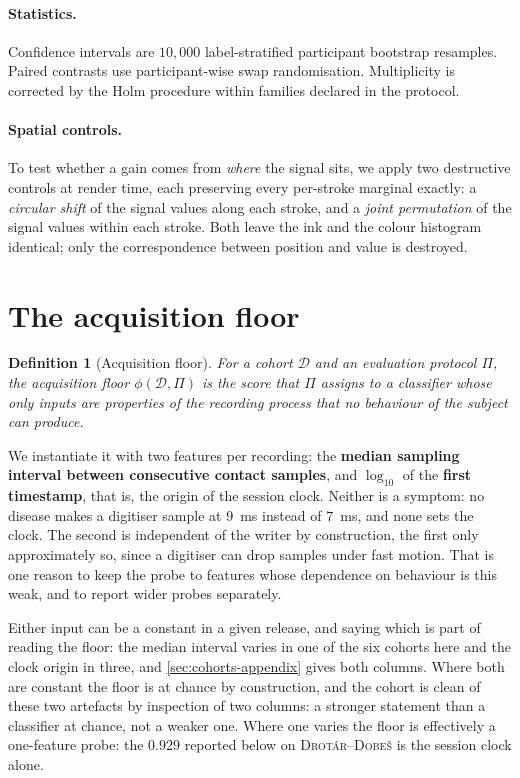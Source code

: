 \documentclass{article}
\newtheorem{definition}{Definition}
\begin{document}
\paragraph{Statistics.} Confidence intervals are $10{,}000$ label-stratified participant bootstrap
resamples. Paired contrasts use participant-wise swap randomisation. Multiplicity is corrected by
the Holm procedure \citep{holm1979} within families declared in the protocol.

\paragraph{Spatial controls.} To test whether a gain comes from \emph{where} the signal sits, we
apply two destructive controls at render time, each preserving every per-stroke marginal exactly:
a \emph{circular shift} of the signal values along each stroke, and a \emph{joint permutation} of
the signal values within each stroke. Both leave the ink and the colour histogram identical; only
the correspondence between position and value is destroyed.

\section{The acquisition floor}
\label{sec:floor}

\begin{definition}[Acquisition floor]
For a cohort $\mathcal{D}$ and an evaluation protocol $\Pi$, the acquisition floor
$\phi(\mathcal{D}, \Pi)$ is the score that $\Pi$ assigns to a classifier whose only inputs are
properties of the recording process that no behaviour of the subject can produce.
\end{definition}

We instantiate it with two features per recording: the \textbf{median sampling interval between
consecutive contact samples}, and $\log_{10}$ of the \textbf{first timestamp}, that is, the origin
of the session clock. Neither is a symptom: no disease makes a digitiser sample at $9$~ms instead
of $7$~ms, and none sets the clock. The second is independent of the writer by construction, the
first only approximately so, since a digitiser can drop samples under fast motion. That is one
reason to keep the probe to features whose dependence on behaviour is this weak, and to report wider
probes separately.

Either input can be a constant in a given release, and saying which is part of reading the floor:
the median interval varies in one of the six cohorts here and the clock origin in three, and
\cref{sec:cohorts-appendix} gives both columns. Where
both are constant the floor is at chance by construction, and the cohort is clean of these two
artefacts by inspection of two columns: a stronger statement than a classifier at chance, not a
weaker one. Where one varies the floor is effectively a one-feature probe: the $0.929$ reported
below on \textsc{Drot\'ar--Dobe\v{s}} is the session clock alone.
\end{document}
